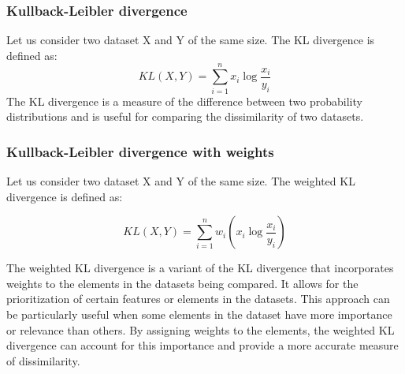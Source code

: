 \subsubsection{Kullback-Leibler divergence} Let us consider two dataset X and Y of the same size. The KL divergence is defined as:\[KL(X,Y) = \sum_{i=1}^{n}x_i \log \frac{x_i}{y_i}\]
The KL divergence is a measure of the difference between two probability distributions and is useful for comparing the dissimilarity of two datasets.


\subsubsection{Kullback-Leibler divergence with weights} Let us consider two dataset X and Y of the same size. The weighted KL divergence is defined as:

\[KL(X,Y) = \sum_{i=1}^{n}w_i(x_i \log \frac{x_i}{y_i})\]

The weighted KL divergence is a variant of the KL divergence that incorporates weights to the elements in the datasets being compared.
It allows for the prioritization of certain features or elements in the datasets.
This approach can be particularly useful when some elements in the dataset have more importance or relevance than others.
By assigning weights to the elements, the weighted KL divergence can account for this importance and provide a more accurate measure of dissimilarity.

